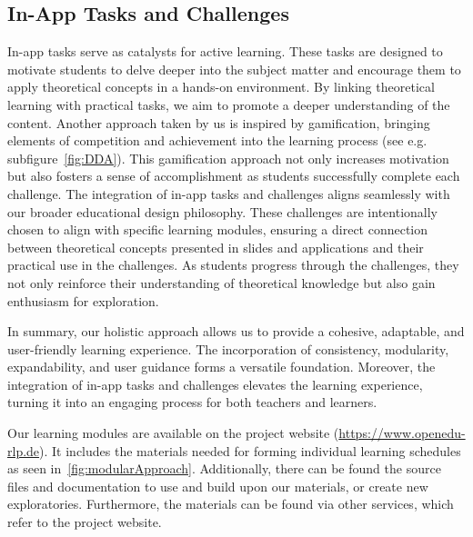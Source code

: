 \subsection{In-App Tasks and Challenges}
In-app tasks serve as catalysts for active learning. These tasks are designed to motivate students to delve deeper into the subject matter and encourage them to apply theoretical concepts in a hands-on environment. By linking theoretical learning with practical tasks, we aim to promote a deeper understanding of the content. Another approach taken by us is inspired by gamification, bringing elements of competition and achievement into the learning process (see e.g. subfigure~\ref{fig:DDA}).
This gamification approach not only increases motivation but also fosters a sense of accomplishment as students successfully complete each challenge. The integration of in-app tasks and challenges aligns seamlessly with our broader educational design philosophy. These challenges are intentionally chosen to align with specific learning modules, ensuring a direct connection between theoretical concepts presented in slides and applications and their practical use in the challenges. As students progress through the challenges, they not only reinforce their understanding of theoretical knowledge but also gain enthusiasm for exploration.

In summary, our holistic approach allows us to provide a cohesive, adaptable, and user-friendly learning experience. The incorporation of consistency, modularity, expandability, and user guidance forms a versatile foundation. Moreover, the integration of in-app tasks and challenges elevates the learning experience, turning it into an engaging process for both teachers and learners.

Our learning modules are available on the project website (\href{https://openedu-rlp.de/edu-sharing/components/collections?id=fd3957ef-80aa-4440-8956-c1d0d738c629}{https://www.openedu-rlp.de}). It includes the materials needed for forming individual learning schedules as seen in~\autoref{fig:modularApproach}. Additionally, there can be found the source files and documentation to use and build upon our materials, or create new exploratories. Furthermore, the materials can be found via other services, which refer to the project website. %

